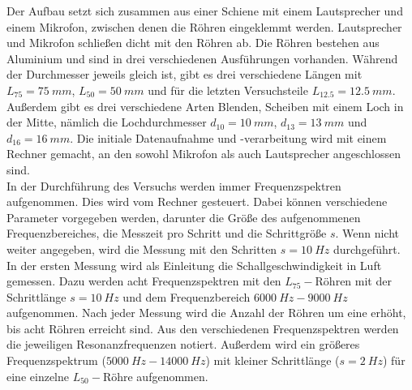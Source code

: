 %
Der Aufbau setzt sich zusammen aus einer Schiene mit einem Lautsprecher und einem Mikrofon, zwischen denen die Röhren eingeklemmt werden.
Lautsprecher und Mikrofon schließen dicht mit den Röhren ab.
Die Röhren bestehen aus Aluminium und sind in drei verschiedenen Ausführungen vorhanden.
Während der Durchmesser jeweils gleich ist, gibt es drei verschiedene Längen mit $L_{75} = \SI{75}{mm}$, $L_{50} = \SI{50}{mm}$ und für die letzten Versuchsteile $L_{12.5} = \SI{12.5}{mm}$.
Außerdem gibt es drei verschiedene Arten Blenden, Scheiben mit einem Loch in der Mitte, nämlich die Lochdurchmesser $d_{10} = \SI{10}{mm}$, $d_{13} = \SI{13}{mm}$ und $d_{16} = \SI{16}{mm}$.
Die initiale Datenaufnahme und -verarbeitung wird mit einem Rechner gemacht, an den sowohl Mikrofon als auch Lautsprecher angeschlossen sind.\\
%
In der Durchführung des Versuchs werden immer Frequenzspektren aufgenommen.
Dies wird vom Rechner gesteuert.
Dabei können verschiedene Parameter vorgegeben werden, darunter die Größe des aufgenommenen Frequenzbereiches, die Messzeit pro Schritt und die Schrittgröße $s$.
Wenn nicht weiter angegeben, wird die Messung mit den Schritten $s = \SI{10}{Hz}$ durchgeführt.\\
%
In der ersten Messung wird als Einleitung die Schallgeschwindigkeit in Luft gemessen.
Dazu werden acht Frequenzspektren mit den $L_{75}-$Röhren mit der Schrittlänge $ s= \SI{10}{Hz}$ und dem Frequenzbereich $\SI{6000}{Hz} - \SI{9000}{Hz}$ aufgenommen.
Nach jeder Messung wird die Anzahl der Röhren um eine erhöht, bis acht Röhren erreicht sind.
Aus den verschiedenen Frequenzspektren werden die jeweiligen Resonanzfrequenzen notiert.
Außerdem wird ein größeres Frequenzspektrum ($\SI{5000}{Hz}-\SI{14000}{Hz}$) mit kleiner Schrittlänge ($s = \SI{2}{Hz}$) für eine einzelne $L_{50}-$Röhre aufgenommen.\\

